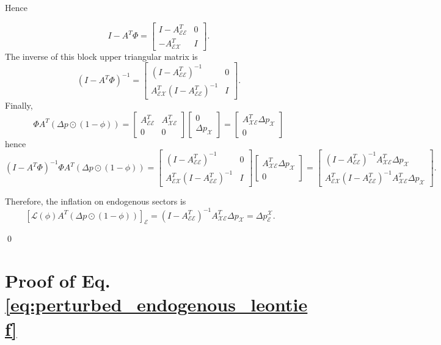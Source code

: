 \documentclass{article}
\begin{document}
\noindent Hence 

\[
I - A^T \Phi =
\begin{bmatrix}
I - A_{\mathcal{EE}}^T & 0 \\
-A_{\mathcal{EX}}^T & I
\end{bmatrix}.
\]
The inverse of this block upper triangular matrix is
\[
(I - A^T \Phi)^{-1} =
\begin{bmatrix}
(I - A_{\mathcal{EE}}^T)^{-1} & 0 \\
A_{\mathcal{EX}}^T (I - A_{\mathcal{EE}}^T)^{-1}  & I
\end{bmatrix}.
\]
Finally,
\[
\Phi A^T (\Delta p \odot (1 - \phi)) = \begin{bmatrix}
A_{\mathcal{EE}}^T & A_{\mathcal{XE}}^T \\
0 & 0
\end{bmatrix}
\begin{bmatrix}
0 \\
\Delta p_\mathcal{X}
\end{bmatrix}
=
\begin{bmatrix}
A_{\mathcal{XE}}^T \Delta p_\mathcal{X} \\
0
\end{bmatrix}
\]
hence
\[
(I - A^T \Phi)^{-1} \Phi A^T (\Delta p \odot (1 - \phi)) =
\begin{bmatrix}
(I - A_{\mathcal{EE}}^T)^{-1} & 0 \\
A_{\mathcal{EX}}^T (I - A_{\mathcal{EE}}^T)^{-1}  & I
\end{bmatrix}
\begin{bmatrix}
A_{\mathcal{XE}}^T \Delta p_\mathcal{X} \\
0
\end{bmatrix}
=
\begin{bmatrix}
(I - A_{\mathcal{EE}}^T)^{-1} A_{\mathcal{XE}}^T \Delta p_\mathcal{X} \\
A_{\mathcal{EX}}^T (I - A_{\mathcal{EE}}^T)^{-1} A_{\mathcal{XE}}^T \Delta p_\mathcal{X}
\end{bmatrix}
.
\]

Therefore, the inflation on endogenous sectors is
\[
[\mathcal{L} (\phi) A^T \left( \Delta p  \odot (1 - \phi) \right)]_\mathcal{E} = (I - A_{\mathcal{EE}}^T)^{-1} A_{\mathcal{XE}}^T \Delta p_{\mathcal{X}} = \Delta p_{\mathcal{E}}^{\mathcal{X}}.
\qquad
\]

\qed

\section{Proof of Eq. \eqref{eq:perturbed_endogenous_leontief}}
\label{appendix:proof_markup_leontief}
\end{document}
